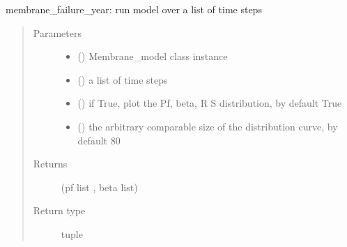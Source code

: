 \documentclass[letterpaper,10pt,english]{sphinxmanual}
\begin{document}

\begin{fulllineitems}
\label{\detokenize{membrane:membrane.membrane_failure_year}}
\sphinxAtStartPar
membrane\_failure\_year: run model over a list of time steps
\begin{quote}\begin{description}
\item[{Parameters}] \leavevmode\begin{itemize}
\item {} 
\sphinxAtStartPar
{} () \textendash{} Membrane\_model class instance

\item {} 
\sphinxAtStartPar
{} (\sphinxstyleliteralemphasis{\sphinxupquote{, }}) \textendash{} a list of time steps

\item {} 
\sphinxAtStartPar
{} (\sphinxstyleliteralemphasis{\sphinxupquote{, }}) \textendash{} if True, plot the Pf, beta, R S distribution, by default True

\item {} 
\sphinxAtStartPar
{} (\sphinxstyleliteralemphasis{\sphinxupquote{, }}) \textendash{} the arbitrary comparable size of the distribution curve, by default 80

\end{itemize}

\item[{Returns}] \leavevmode
\sphinxAtStartPar
(pf list , beta list)

\item[{Return type}] \leavevmode
\sphinxAtStartPar
tuple

\end{description}\end{quote}

\end{fulllineitems}
\end{document}
